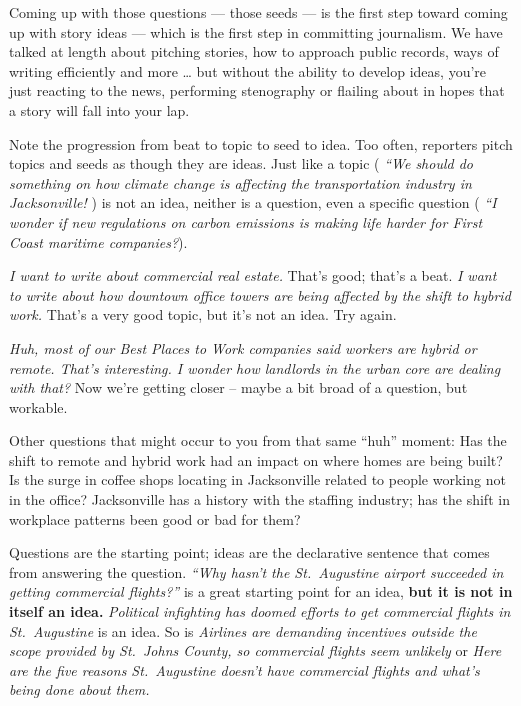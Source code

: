 \documentclass[
  11pt,
  american,
  letterpaperpaper,
  extrafontsizes,onecolumn,openright
  ]{memoir}
\newlength{\rf}
\begin{document}
Coming up with those questions --- those seeds --- is the first step toward coming up with story ideas --- which is the first step in committing journalism. We have talked at length about pitching stories, how to approach public records, ways of writing efficiently and more \ldots{} but without the ability to develop ideas, you're just reacting to the news, performing stenography or flailing about in hopes that a story will fall into your lap.

Note the progression from beat to topic to seed to idea. Too often, reporters pitch topics and seeds as though they are ideas. Just like a topic ( \emph{``We should do something on how climate change is affecting the transportation industry in Jacksonville!} ) is not an idea, neither is a question, even a specific question ( \emph{``I wonder if new regulations on carbon emissions is making life harder for First Coast maritime companies?}).

\emph{I want to write about commercial real estate.} That's good; that's a beat. \emph{I want to write about how downtown office towers are being affected by the shift to hybrid work.} That's a very good topic, but it's not an idea. Try again.

\emph{Huh, most of our Best Places to Work companies said workers are hybrid or remote. That's interesting. I wonder how landlords in the urban core are dealing with that?} Now we're getting closer -- maybe a bit broad of a question, but workable.

Other questions that might occur to you from that same \enquote{huh} moment: Has the shift to remote and hybrid work had an impact on where homes are being built? Is the surge in coffee shops locating in Jacksonville related to people working not in the office? Jacksonville has a history with the staffing industry; has the shift in workplace patterns been good or bad for them?

Questions are the starting point; ideas are the declarative sentence that comes from answering the question. \emph{\enquote{Why hasn't the St.~Augustine airport succeeded in getting commercial flights?}} is a great starting point for an idea, \textbf{but it is not in itself an idea.} \emph{Political infighting has doomed efforts to get commercial flights in St.~Augustine} is an idea. So is \emph{Airlines are demanding incentives outside the scope provided by St.~Johns County, so commercial flights seem unlikely} or \emph{Here are the five reasons St.~Augustine doesn't have commercial flights and what's being done about them.}
\end{document}
